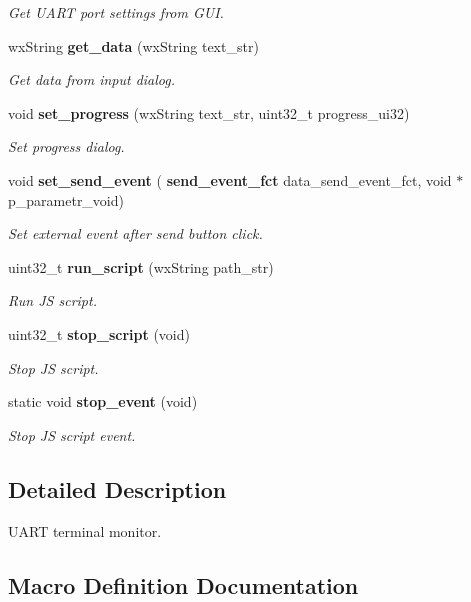 \begin{DoxyCompactItemize}
\begin{DoxyCompactList}\small\item\em Get U\+A\+RT port settings from G\+UI. \end{DoxyCompactList}\item 
wx\+String \textbf{ get\+\_\+data} (wx\+String text\+\_\+str)
\begin{DoxyCompactList}\small\item\em Get data from input dialog. \end{DoxyCompactList}\item 
void \textbf{ set\+\_\+progress} (wx\+String text\+\_\+str, uint32\+\_\+t progress\+\_\+ui32)
\begin{DoxyCompactList}\small\item\em Set progress dialog. \end{DoxyCompactList}\item 
void \textbf{ set\+\_\+send\+\_\+event} (\textbf{ send\+\_\+event\+\_\+fct} data\+\_\+send\+\_\+event\+\_\+fct, void $\ast$p\+\_\+parametr\+\_\+void)
\begin{DoxyCompactList}\small\item\em Set external event after send button click. \end{DoxyCompactList}\item 
uint32\+\_\+t \textbf{ run\+\_\+script} (wx\+String path\+\_\+str)
\begin{DoxyCompactList}\small\item\em Run JS script. \end{DoxyCompactList}\item 
uint32\+\_\+t \textbf{ stop\+\_\+script} (void)
\begin{DoxyCompactList}\small\item\em Stop JS script. \end{DoxyCompactList}\item 
static void \textbf{ stop\+\_\+event} (void)
\begin{DoxyCompactList}\small\item\em Stop JS script event. \end{DoxyCompactList}\end{DoxyCompactItemize}


\subsection{Detailed Description}
U\+A\+RT terminal monitor. 



\subsection{Macro Definition Documentation}
\mbox{\label{group___u_a_r_t__terminal_ga92e1b0371578874fa2691079da8edc27}} 
